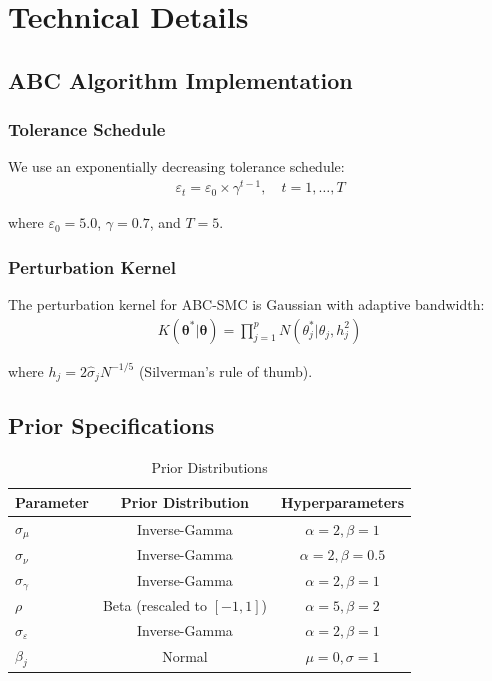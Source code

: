 \section{Technical Details}

\subsection{ABC Algorithm Implementation}

\subsubsection{Tolerance Schedule}

We use an exponentially decreasing tolerance schedule:
\begin{align}
    \varepsilon_t = \varepsilon_0 \times \gamma^{t-1}, \quad t = 1, \ldots, T
\end{align}

where $\varepsilon_0 = 5.0$, $\gamma = 0.7$, and $T = 5$.

\subsubsection{Perturbation Kernel}

The perturbation kernel for ABC-SMC is Gaussian with adaptive bandwidth:
\begin{align}
    K(\boldsymbol{\theta}^* | \boldsymbol{\theta}) = \prod_{j=1}^{p} N(\theta_j^* | \theta_j, h_j^2)
\end{align}

where $h_j = 2 \hat{\sigma}_j N^{-1/5}$ (Silverman's rule of thumb).

\subsection{Prior Specifications}

\begin{table}[h]
\centering
\caption{Prior Distributions}
\begin{tabular}{lcc}
\toprule
Parameter & Prior Distribution & Hyperparameters \\
\midrule
$\sigma_\mu$ & Inverse-Gamma & $\alpha = 2, \beta = 1$ \\
$\sigma_\nu$ & Inverse-Gamma & $\alpha = 2, \beta = 0.5$ \\
$\sigma_\gamma$ & Inverse-Gamma & $\alpha = 2, \beta = 1$ \\
$\rho$ & Beta (rescaled to $[-1,1]$) & $\alpha = 5, \beta = 2$ \\
$\sigma_\varepsilon$ & Inverse-Gamma & $\alpha = 2, \beta = 1$ \\
$\beta_j$ & Normal & $\mu = 0, \sigma = 1$ \\
\bottomrule
\end{tabular}
\end{table}

